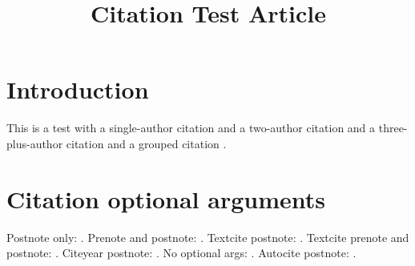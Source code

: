 \documentclass{ccr}
\title{Citation Test Article}
\begin{document}
\maketitle

\section{Introduction}
This is a test with a single-author citation \cite{smith2020test}
and a two-author citation \cite{jones2021multi}
and a three-plus-author citation \cite{team2022three}
and a grouped citation \cite{smith2020test,jones2021multi,team2022three}.

\section{Citation optional arguments}
Postnote only: \parencite[p.~42]{smith2020test}.
Prenote and postnote: \parencite[cf.][p.~42]{smith2020test}.
Textcite postnote: \textcite[p.~42]{jones2021multi}.
Textcite prenote and postnote: \textcite[see][p.~99]{team2022three}.
Citeyear postnote: \citeyear[p.~42]{smith2020test}.
No optional args: \parencite{jones2021multi}.
Autocite postnote: \autocite[p.~7]{team2022three}.

\printbibliography
\end{document}
